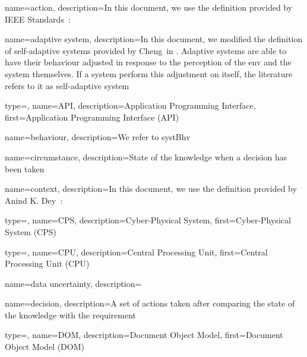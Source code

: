 {
	name={ac\-tion},
	description={In this document, we use the definition provided by IEEE Standards~\cite{iso2017systems}: }
}

{
	name={a\-dap\-tive sys\-tem},
	description={In this document, we modified the definition of self-adaptive systems provided by Cheng~\etal in \cite{DBLP:conf/dagstuhl/ChengLGIMABBBCSDFGGGKKKLMMMPSTTWW09}. Adaptive systems are able to have their \gls{behaviour} adjusted in response to the perception of the \gls{env} and the system themselves. If a system perform this adjustment on itself, the literature refers to it as self-adaptive system}
}

{
	type=\acronymtype,
	name={API},
	description={Application Programming Interface},
	first={Application Programming Interface (API)}
}

{
	name={be\-ha\-viour},
	description={We refer to \gls{systBhv}}
}

{
	name={cir\-cums\-tance},
	description={State of the \gls{knowledge} when a \gls{decision} has been taken}
}

{
	name={con\-text},
	description={In this document, we use the definition provided by Anind K. Dey~\cite{DBLP:journals/puc/Dey01}: }
}

{
	type=\acronymtype,
	name={CPS},
	description={Cyber-Physical System},
	first={Cyber-Physical System (CPS)}
}

{
	type=\acronymtype,
	name={CPU},
	description={Central Processing Unit},
	first={Central Processing Unit (CPU)}
}

{
	name={data uncertainty},
	description={}
}

{
	name={de\-ci\-sion},
	description={A set of \glspl{action} taken after comparing the state of the \gls{knowledge} with the \gls{requirement}}
}

{
	type=\acronymtype,
	name={DOM},
	description={Document Object Model},
	first={Document Object Model (DOM)}
}

